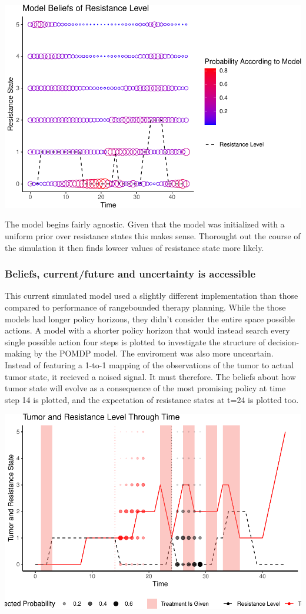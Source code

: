 \documentclass[notspecified,article,submit,moreauthors,pdftex]{Definitions/mdpi}
\begin{document}
\includegraphics{SocultPaper_files/figure-latex/unnamed-chunk-6-1.pdf}

The model begins fairly agnostic. Given that the model was initialized
with a uniform prior over resistance states this makes sense. Thorought
out the course of the simulation it then finds loweer values of
resistance state more likely.

\subsubsection{Beliefs, current/future and uncertainty is
accessible}\label{beliefs-currentfuture-and-uncertainty-is-accessible}

This current simulated model used a slightly different implementation
than those compared to performance of rangebounded therapy planning.
While the those models had longer policy horizons, they didn't consider
the entire space possible actions. A model with a shorter policy horizon
that would instead search every single possible action four steps is
plotted to investigate the structure of decision-making by the POMDP
model. The enviroment was also more unceartain. Instead of featuring a
1-to-1 mapping of the observations of the tumor to actual tumor state,
it recieved a noised signal. It must therefore. The beliefs about how
tumor state will evolve as a consequence of the most promising policy at
time step 14 is plotted, and the expectation of resistance states at
t=24 is plotted too.

\includegraphics{SocultPaper_files/figure-latex/unnamed-chunk-7-1.pdf}
\end{document}
